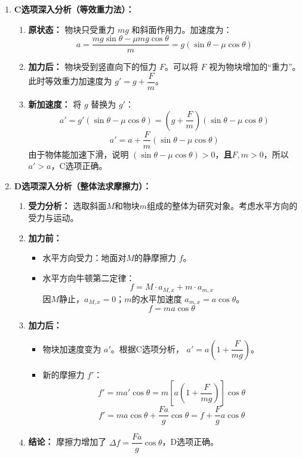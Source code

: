 \documentclass[CJKmath,a4paper,10pt]{exam-zh}
\begin{document}
\begin{liti}
\begin{enumerate}
\textbf{结论：} 只有当$\theta=0^\circ$（水平面上加速）时，结果才可能是$m\sqrt{a^2+g^2}$。题目给出的表达式忽略了能够体现方向的交叉项$-2ag\sin\theta$，故B选项错误。

\item 
\textbf{C选项深入分析（等效重力法）：}

\begin{enumerate}
    \item \textbf{原状态：} 物块只受重力 $mg$ 和斜面作用力。加速度为：
    \[ a = \frac{mg\sin\theta - \mu mg\cos\theta}{m} = g(\sin\theta - \mu\cos\theta) \]
    \item \textbf{加力后：} 物块受到竖直向下的恒力 $F$。可以将 $F$ 视为物块增加的“重力”。
    此时等效重力加速度为 $g' = g + \dfrac{F}{m}$。
    \item \textbf{新加速度：} 将 $g$ 替换为 $g'$：
    \[ a' = g'(\sin\theta - \mu\cos\theta) = \left(g + \dfrac{F}{m}\right)(\sin\theta - \mu\cos\theta) \]
    \[ a' = a + \dfrac{F}{m}(\sin\theta - \mu\cos\theta) \]
    由于物体能加速下滑，说明 $(\sin\theta - \mu\cos\theta) > 0$，\textbf{且$F, m > 0$}，所以 $a' > a$，C选项正确。
\end{enumerate}

\item 
\textbf{D选项深入分析（整体法求摩擦力）：}

\begin{enumerate}
    \item \textbf{受力分析：} 选取斜面$M$和物块$m$组成的整体为研究对象。考虑水平方向的受力与运动。
    \item \textbf{加力前：}
    \begin{itemize}
        \item 水平方向受力：地面对$M$的静摩擦力 $f$。
        \item 水平方向牛顿第二定律：
        \[ f = M \cdot a_{M,x} + m \cdot a_{m,x} \]
        因$M$静止，$a_{M,x}=0$；$m$的水平加速度 $a_{m,x} = a\cos\theta$。
        \[ f = m a \cos\theta \]
    \end{itemize}
    \item \textbf{加力后：}
    \begin{itemize}
        \item 物块加速度变为 $a'$。根据C选项分析， $a' = a\left(1 + \dfrac{F}{mg}\right)$。
        \item 新的摩擦力 $f'$：
        \[ f' = m a' \cos\theta = m \left[ a \left( 1 + \dfrac{F}{mg} \right) \right] \cos\theta \]
        \[ f' = m a \cos\theta + \dfrac{F a}{g} \cos\theta = f + \dfrac{F}{g} a \cos\theta \]
    \end{itemize}
    \item \textbf{结论：} 摩擦力增加了 $\Delta f = \dfrac{F a}{g} \cos\theta$，D选项正确。
\end{enumerate}

\end{enumerate}

\end{liti}
\end{document}
